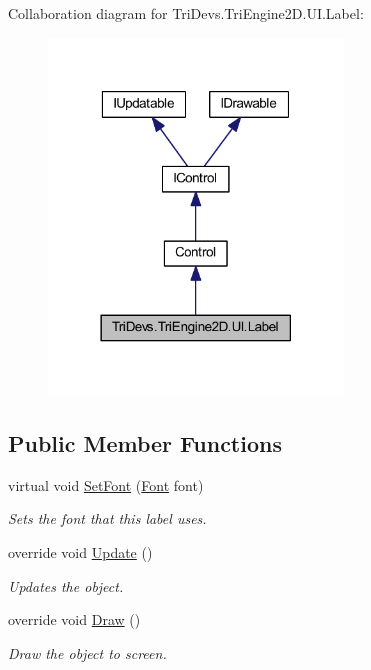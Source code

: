 Collaboration diagram for Tri\-Devs.\-Tri\-Engine2\-D.\-U\-I.\-Label\-:\nopagebreak
\begin{figure}[H]
\begin{center}
\leavevmode
\includegraphics[width=222pt]{class_tri_devs_1_1_tri_engine2_d_1_1_u_i_1_1_label__coll__graph}
\end{center}
\end{figure}
\subsection*{Public Member Functions}
\begin{DoxyCompactItemize}
\item 
virtual void \hyperlink{class_tri_devs_1_1_tri_engine2_d_1_1_u_i_1_1_label_a31b2de1912fc33234435806d5a2ef644}{Set\-Font} (\hyperlink{class_tri_devs_1_1_tri_engine2_d_1_1_text_1_1_font}{Font} font)
\begin{DoxyCompactList}\small\item\em Sets the font that this label uses. \end{DoxyCompactList}\item 
override void \hyperlink{class_tri_devs_1_1_tri_engine2_d_1_1_u_i_1_1_label_a97e8c9ee95cedecab10ba505438e0d1b}{Update} ()
\begin{DoxyCompactList}\small\item\em Updates the object. \end{DoxyCompactList}\item 
override void \hyperlink{class_tri_devs_1_1_tri_engine2_d_1_1_u_i_1_1_label_aaa532c9037ca1b51bab8f7eb2673438d}{Draw} ()
\begin{DoxyCompactList}\small\item\em Draw the object to screen. \end{DoxyCompactList}\end{DoxyCompactItemize}
